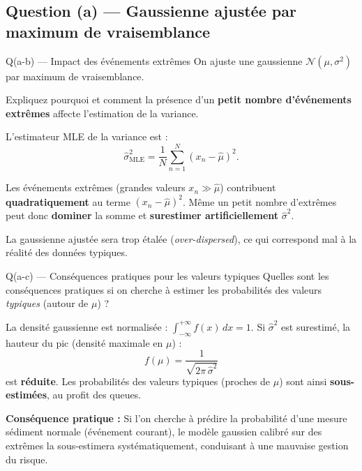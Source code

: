 \documentclass[12pt,a4paper]{article}
\begin{document}
\subsection{Question (a) — Gaussienne ajustée par maximum de vraisemblance}

\begin{enonce}{Q(a-b) — Impact des événements extrêmes}
On ajuste une gaussienne $\mathcal{N}(\mu, \sigma^2)$ par maximum de vraisemblance.

Expliquez pourquoi et comment la présence d'un \textbf{petit nombre d'événements extrêmes}
affecte l'estimation de la variance.
\end{enonce}

\begin{solution}

L'estimateur MLE de la variance est :
\[
  \hat{\sigma}^2_{\mathrm{MLE}}
  = \frac{1}{N}\sum_{n=1}^{N}(x_n - \hat{\mu})^2.
\]

Les événements extrêmes (grandes valeurs $x_n \gg \hat{\mu}$) contribuent
\textbf{quadratiquement} au terme $(x_n - \hat{\mu})^2$.
Même un petit nombre d'extrêmes peut donc \textbf{dominer} la somme et
\textbf{surestimer artificiellement} $\hat{\sigma}^2$.

La gaussienne ajustée sera trop étalée (\emph{over-dispersed}),
ce qui correspond mal à la réalité des données typiques.
\end{solution}

\begin{enonce}{Q(a-c) — Conséquences pratiques pour les valeurs typiques}
Quelles sont les conséquences pratiques si on cherche à estimer les probabilités
des valeurs \emph{typiques} (autour de $\mu$) ?
\end{enonce}

\begin{solution}

La densité gaussienne est normalisée : $\int_{-\infty}^{+\infty} f(x)\,dx = 1$.
Si $\hat{\sigma}^2$ est surestimé, la hauteur du pic (densité maximale en $\mu$) :
\[
  f(\mu) = \frac{1}{\sqrt{2\pi\,\hat{\sigma}^2}}
\]
est \textbf{réduite}. Les probabilités des valeurs typiques (proches de $\mu$)
sont ainsi \textbf{sous-estimées}, au profit des queues.

\textbf{Conséquence pratique :}
Si l'on cherche à prédire la probabilité d'une mesure sédiment normale (événement courant),
le modèle gaussien calibré sur des extrêmes la sous-estimera systématiquement,
conduisant à une mauvaise gestion du risque.
\end{solution}
\end{document}
